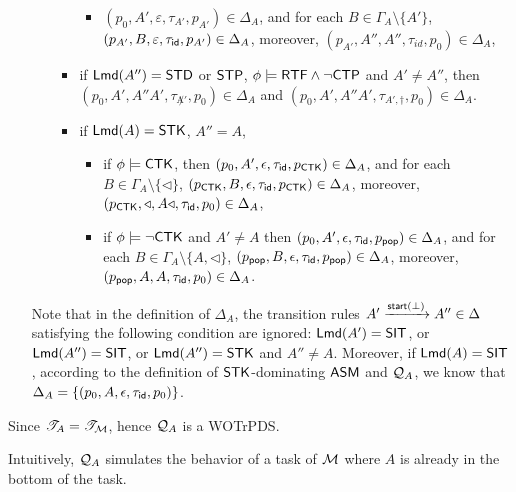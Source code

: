 \begin{itemize}
\begin{itemize}
\begin{itemize}
\begin{itemize}
					\item $(p_0, A', \varepsilon, \tau_{A'}, p_{A'}) \in \Delta_{A}$, and for each $B \in \Gamma_A\setminus\{A'\}$, $(p_{A'}, B, \varepsilon, \tau_{\mathsf{id}}, p_{A'}) \in \Delta_{A}$, moreover, $(p_{A'}, A'', A'', \tau_{id}, p_0)  \in \Delta_{A}$, 
				\end{itemize}
				\item if ${\sf Lmd}(A'') = \mathsf{STD}$ or $\mathsf{STP}$, $\phi\models{\sf RTF}\wedge\neg{\sf CTP}$ and $A'\neq A''$,
                then $(p_0, A', A''A', \tau_{\not A'}, p_0) \in \Delta_{A}$ 
                and $(p_0, A', A''A', \tau_{A', \dag}, p_0) \in \Delta_{A}$.
                \item if ${\sf Lmd}(A) = \mathsf{STK}$, $A'' = A$, 
			\begin{itemize}
				\item if $\phi\models{\sf CTK}$, then $(p_0, A', \epsilon, \tau_{\mathsf{id}}, p_{{\sf CTK}}) \in \Delta_{A}$, and for each $B\in\Gamma_A\setminus\{\triangleleft\}$, $(p_{{\sf CTK}},B,\epsilon,\tau_{\mathsf{id}}, p_{{\sf CTK}})\in\Delta_{A}$, moreover, $(p_{{\sf CTK}},\triangleleft,A\triangleleft,\tau_{\mathsf{id}},p_0)\in\Delta_{A}$, 
				\item if $\phi\models\neg{\sf CTK}$ and $A'\neq A$ then 
                $(p_0, A',\epsilon,\tau_{\mathsf{id}},p_{\mathsf{pop}})\in\Delta_{A}$, and for each $B\in\Gamma_A\setminus\{A,\triangleleft\}$, $(p_{\mathsf{pop}},B,\epsilon,\tau_{\mathsf{id}},p_{\mathsf{pop}})\in\Delta_{A}$, moreover, $(p_{\mathsf{pop}},A,A,\tau_{\mathsf{id}},p_0)\in\Delta_{A}$.
			\end{itemize}
			\end{itemize}
        \end{itemize}
Note that in the definition of $\Delta_{A}$, the transition rules $A' \xrightarrow{{\mathsf{start} }(\bot)} A'' \in \Delta$ satisfying the following condition are ignored: ${\sf Lmd}(A') = {\sf SIT}$, or ${\sf Lmd}(A'') = {\sf SIT}$, or ${\sf Lmd}(A'') = {\sf STK}$ and $A'' \neq A$. 
Moreover, if ${\sf Lmd}(A) = {\sf SIT}$, according to the definition of $\mathsf{STK}$-dominating $\textsf{ASM}$ and ${\mathcal{Q} }_A$, we know that $\Delta_A = \{(p_0,A,\epsilon,\tau_{\mathsf{id}}, p_0)\}$.
\end{itemize}

Since ${\mathscr{T} }_{A} = {\mathscr{T} }_{{\mathcal{M} }}$, hence ${\mathcal{Q} }_{A}$ is a {WOTrPDS}.

Intuitively, ${\mathcal{Q} }_{A}$ simulates the behavior of a task of ${\mathcal{M} }$ where $A$ is already in the bottom of the task. 


